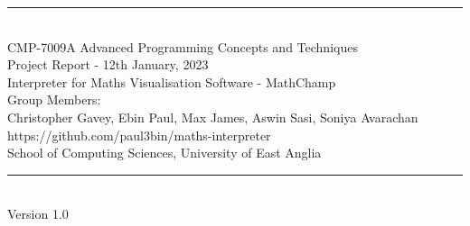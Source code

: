 \documentclass[a4paper, oneside, 11pt]{report}
\begin{document}
\begin{titlepage}
\begin{center}
\rule{12cm}{1mm} \\
\vspace{1cm}
{\large  CMP-7009A Advanced Programming Concepts and Techniques}
\vspace{7.5cm}
\\{\Large Project Report - 12th January, 2023}
\vspace{1.5cm}
\\{\LARGE Interpreter for Maths Visualisation Software - MathChamp}
\vspace{1.0cm}
\\{\Large Group Members: \\ Christopher Gavey, Ebin Paul, Max James, Aswin Sasi, Soniya Avarachan}
\vspace{1.0cm}
\\{\Large https://github.com/paul3bin/maths-interpreter}
\vspace{8.0cm}
\\{\large School of Computing Sciences, University of East Anglia}
\\ \rule{12cm}{0.5mm}
\\ \hspace{8.5cm} {\large Version 1.0}
\end{center}
\end{titlepage}

\setcounter{page}{1}

\tableofcontents


\begin{abstract}
This project aimed to develop an intuitive Python-focused Mathematical Interpreter, \emph{MathChamp}, with an interactive Graphical User Interface (GUI) utilising \emph{PyQt5}. The first step was researching similar interpreters, such as \emph{MATLAB}. Following the analysis of approaches and completing the design process, lexical analysis was planned in detail and developed. Upon completion of the lexer, an abstract syntax tree (AST) was generated for syntactic analysis and integrated. The GUI was designed, developed, and integrated in the next stage with the core \emph{MathChamp} program. The final step of implementation was visualising expressions with settings-rich plots and implementing additional features. Throughout the project, \emph{MathChamp} followed the agile scrum methodology for consistent iterative and incremental development (IID) across the project life cycle. The project was split into development sprints, and roles were allocated for these sprints across the development team, with set and measured goals and deadlines. The final \emph{MathChamp} solution delivers a modern and powerful user interface where users can enter expressions, statements, and commands with function calls using custom syntax. Variables can be defined, manipulated, and visualised, and additional features include zero crossings, factorials, and Boolean operations.
\end{abstract}
\end{document}
